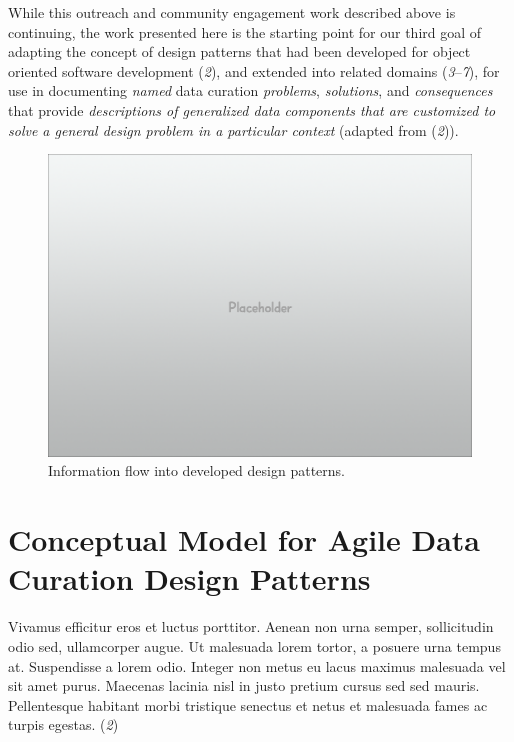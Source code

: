 \documentclass[final]{beamer}
\begin{document}
\begin{frame}[t]
\begin{multicols}{3}
While this outreach and community engagement work described above is
continuing, the work presented here is the starting point for our third
goal of adapting the concept of design patterns that had been developed
for object oriented software development (\emph{2}), and extended into
related domains (\emph{3}--\emph{7}), for use in documenting
\emph{named} data curation \emph{problems}, \emph{solutions}, and
\emph{consequences} that provide \emph{descriptions of generalized data
components that are customized to solve a general design problem in a
particular context} (adapted from (\emph{2})).

\begin{figure}[htbp]
\centering
\includegraphics{placeholder.png}
\caption{Information flow into developed design patterns.}
\end{figure}

\section{Conceptual Model for Agile Data Curation Design
Patterns}\label{conceptual-model-for-agile-data-curation-design-patterns}

Vivamus efficitur eros et luctus porttitor. Aenean non urna semper,
sollicitudin odio sed, ullamcorper augue. Ut malesuada lorem tortor, a
posuere urna tempus at. Suspendisse a lorem odio. Integer non metus eu
lacus maximus malesuada vel sit amet purus. Maecenas lacinia nisl in
justo pretium cursus sed sed mauris. Pellentesque habitant morbi
tristique senectus et netus et malesuada fames ac turpis egestas.
(\emph{2})


\end{multicols}
\end{frame}
\end{document}
